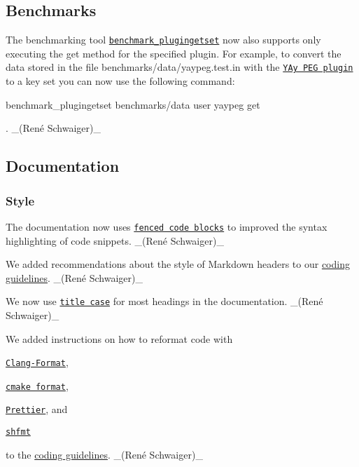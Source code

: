 \subsection*{Benchmarks}


\begin{DoxyItemize}
\item The benchmarking tool \href{/home/markus/Projekte/Elektra/current/benchmarks/plugingetset.c}{\tt {\ttfamily benchmark\+\_\+plugingetset}} now also supports only executing the {\ttfamily get} method for the specified plugin. For example, to convert the data stored in the file {\ttfamily benchmarks/data/yaypeg.\+test.\+in} with the \href{https://www.libelektra.org/plugins/yaypeg}{\tt Y\+Ay P\+EG plugin} to a key set you can now use the following command\+:
\end{DoxyItemize}


\begin{DoxyCode}
benchmark\_plugingetset benchmarks/data user yaypeg get
\end{DoxyCode}


. \+\_\+(René Schwaiger)\+\_\+

\subsection*{Documentation}

\subsubsection*{Style}


\begin{DoxyItemize}
\item The documentation now uses \href{https://help.github.com/en/articles/creating-and-highlighting-code-blocks#syntax-highlighting}{\tt fenced code blocks} to improved the syntax highlighting of code snippets. \+\_\+(René Schwaiger)\+\_\+
\item We added recommendations about the style of Markdown headers to our \hyperlink{doc_CODING_md}{coding guidelines}. \+\_\+(René Schwaiger)\+\_\+
\item We now use \href{https://en.wiktionary.org/wiki/title_case}{\tt title case} for most headings in the documentation. \+\_\+(René Schwaiger)\+\_\+
\item We added instructions on how to reformat code with
\begin{DoxyItemize}
\item \href{https://clang.llvm.org/docs/ClangFormat.html}{\tt Clang-\/\+Format},
\item \href{https://github.com/cheshirekow/cmake_format}{\tt cmake format},
\item \href{https://prettier.io}{\tt Prettier}, and
\item \href{https://github.com/mvdan/sh}{\tt shfmt}
\end{DoxyItemize}

to the \hyperlink{doc_CODING_md}{coding guidelines}. \+\_\+(René Schwaiger)\+\_\+
\end{DoxyItemize}

